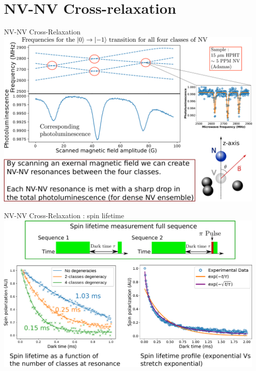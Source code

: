 \documentclass{beamer}
\begin{document}
\section{NV-NV Cross-relaxation}
\begin{frame}
\tableofcontents[currentsection]
\end{frame}
\begin{frame}{NV-NV Cross-Relaxation}
\centering
\includegraphics[scale=.2]{Slide_CR_NV-NV}
\end{frame}
\begin{frame}{NV-NV Cross-Relaxation : spin lifetime}
\centering
\includegraphics[scale=.28]{Slide_CR_NV-NV_T1}
\end{frame}
\end{document}
